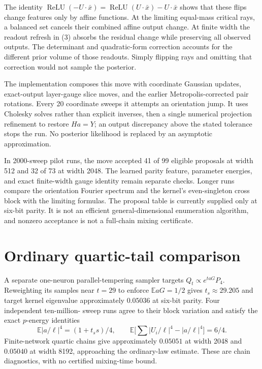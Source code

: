 \documentclass[11pt]{article}
\newcommand{\E}{\mathbb E}\newcommand{\R}{\mathbb R}\newcommand{\relu}{\operatorname{ReLU}}
\begin{document}
The identity
$\relu(-U\cdot\bar x)=\relu(U\cdot\bar x)-U\cdot\bar x$
shows that these flips change features only by affine functions.
At the limiting equal-mass critical rays, a balanced set cancels their
combined affine output change. At finite width the readout refresh in
(3) absorbs the residual change while preserving all observed outputs.
The determinant and quadratic-form correction accounts for the different
prior volume of those readouts. Simply flipping rays and omitting that
correction would not sample the posterior.

The implementation composes this move with coordinate Gaussian updates,
exact-output layer-gauge slice moves, and the earlier Metropolis-corrected
pair rotations. Every 20 coordinate sweeps it attempts an orientation
jump. It uses Cholesky solves rather than explicit inverses, then a single
numerical projection refinement to restore $Ha=Y$; an output discrepancy
above the stated tolerance stops the run. No posterior likelihood is
replaced by an asymptotic approximation.

In 2000-sweep pilot runs, the move accepted 41 of 99 eligible proposals
at width 512 and 32 of 73 at width 2048. The learned parity feature,
parameter energies, and exact finite-width gauge identity remain separate
checks. Longer runs compare the orientation Fourier spectrum and the
kernel's even-singleton cross block with the limiting formulas.
The proposal table is currently supplied only at six-bit parity.
It is not an efficient general-dimensional enumeration algorithm, and
nonzero acceptance is not a full-chain mixing certificate.

\section{Ordinary quartic-tail comparison}
A separate one-neuron parallel-tempering sampler targets
$Q_t\propto e^{t aG}P_4$. Reweighting its samples near $t=29$ to enforce
$\E aG=1/2$ gives $t_s\approx29.205$ and target kernel eigenvalue
approximately $0.05036$ at six-bit parity. Four independent ten-million-
sweep runs agree to their block variation and satisfy the exact
$p$-energy identities
\[
 \E|a/\ell|^4=(1+t_ss)/4,\qquad
 \E\bigl[\textstyle\sum|U_i/\ell|^4-|a/\ell|^4\bigr]=6/4.
\]
Finite-network quartic chains give approximately $0.05051$ at width 2048
and $0.05040$ at width 8192, approaching the ordinary-law estimate.
These are chain diagnostics, with no certified mixing-time bound.
\end{document}
